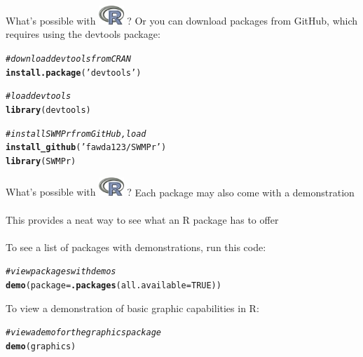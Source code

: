 \documentclass[xcolor=svgnames]{beamer}\usepackage[]{graphicx}\usepackage[]{color}
\makeatletter
\newcommand{\hlnum}[1]{\textcolor[rgb]{0.686,0.059,0.569}{#1}}%
\newcommand{\hlstr}[1]{\textcolor[rgb]{0.192,0.494,0.8}{#1}}%
\newcommand{\hlcom}[1]{\textcolor[rgb]{0.678,0.584,0.686}{\textit{#1}}}%
\newcommand{\hlstd}[1]{\textcolor[rgb]{0.345,0.345,0.345}{#1}}%
\newcommand{\hlkwc}[1]{\textcolor[rgb]{0.333,0.667,0.333}{#1}}%
\newcommand{\hlkwd}[1]{\textcolor[rgb]{0.737,0.353,0.396}{\textbf{#1}}}%
\newenvironment{kframe}{%
 \def\at@end@of@kframe{}%
 \ifinner\ifhmode%
  \def\at@end@of@kframe{\end{minipage}}%
  \begin{minipage}{\columnwidth}%
 \fi\fi%
 \def\FrameCommand##1{\hskip\@totalleftmargin \hskip-\fboxsep
 \colorbox{shadecolor}{##1}\hskip-\fboxsep
     \hskip-\linewidth \hskip-\@totalleftmargin \hskip\columnwidth}%
 \MakeFramed {\advance\hsize-\width
   \@totalleftmargin\z@ \linewidth\hsize
   \@setminipage}}%
 {\par\unskip\endMakeFramed%
 \at@end@of@kframe}
\newenvironment{knitrout}{}{} %
\makeatother
\begin{document}
\begin{frame}[t,fragile]{What's possible with \includegraphics[width=0.07\textwidth]{Rlogo.jpg} \hspace{0.2em}? }
Or you can download packages from GitHub, which requires using the devtools package:
\begin{knitrout}\scriptsize
{}\color{fgcolor}\begin{kframe}
\begin{alltt}
\hlcom{# download devtools from CRAN}
\hlkwd{install.package}\hlstd{(}\hlstr{'devtools'}\hlstd{)}

\hlcom{# load devtools}
\hlkwd{library}\hlstd{(devtools)}

\hlcom{# install SWMPr from GitHub, load}
\hlkwd{install_github}\hlstd{(}\hlstr{'fawda123/SWMPr'}\hlstd{)}
\hlkwd{library}\hlstd{(SWMPr)}
\end{alltt}
\end{kframe}
\end{knitrout}
\end{frame}

\begin{frame}[t,fragile]{What's possible with \includegraphics[width=0.07\textwidth]{Rlogo.jpg} \hspace{0.2em}? }
Each package may also come with a demonstration\\~\\
This provides a neat way to see what an R package has to offer\\~\\
To see a list of packages with demonstrations, run this code:
\begin{knitrout}\scriptsize
{}\color{fgcolor}\begin{kframe}
\begin{alltt}
\hlcom{# view packages with demos}
\hlkwd{demo}\hlstd{(}\hlkwc{package} \hlstd{=} \hlkwd{.packages}\hlstd{(}\hlkwc{all.available} \hlstd{=} \hlnum{TRUE}\hlstd{))}
\end{alltt}
\end{kframe}
\end{knitrout}
To view a demonstration of basic graphic capabilities in R:
\begin{knitrout}\scriptsize
{}\color{fgcolor}\begin{kframe}
\begin{alltt}
\hlcom{# view a demo for the graphics package}
\hlkwd{demo}\hlstd{(graphics)}
\end{alltt}
\end{kframe}
\end{knitrout}
\end{frame}
\end{document}
